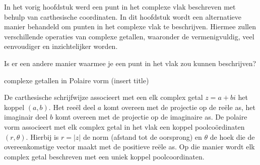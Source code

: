 \documentclass{ximera}
\begin{document}
    \author{Wiskunde Op Maat }
     
    \label{xim:complexe_getallen_polair}  %
 



In het vorig hoofdstuk werd een punt in het complexe vlak beschreven met behulp van carthesische coordinaten.  In dit hoofdstuk wordt een alternatieve manier behandeld om punten in het complexe vlak te beschrijven. Hiermee zullen verschillende operaties van complexe getallen, waaronder de vermenigvuldig, veel eenvoudiger en inzichtelijker worden. 

\begin{quickquestion*}{}
    Is er een andere manier waarmee je een punt in het vlak zou kunnen beschrijven? 
\end{quickquestion*}

 
complexe getallen in Polaire vorm  (insert title)

De carthesische schrijfwijze associeert met een elk complex getal $z=a+bi$ het koppel \((a, b)\). Het reeël deel \(a\) komt overeen met de projectie op de reële as, het imaginair deel \(b\) komt overeen met de projectie op de imaginaire as. De polaire vorm associeert met elk complex getal in het vlak een koppel poolcoördinaten \((r, \theta)\).  Hierbij is $r=|z|$ de norm (afstand tot de oorsprong) en $\theta$ de hoek die de overeenkomstige vector maakt met de positieve reële as. Op die manier wordt elk complex getal beschreven met een uniek koppel poolcoordinaten. 
\end{document}
